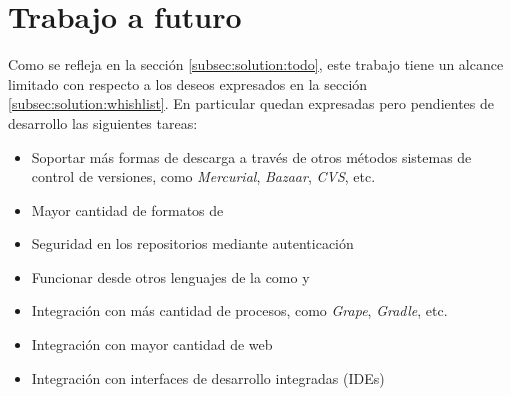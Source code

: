 \section{Trabajo a futuro}
\label{sec:futurework}

Como se refleja en la sección \ref{subsec:solution:todo}, este trabajo tiene un 
alcance limitado con respecto a los deseos expresados en la sección 
\ref{subsec:solution:whishlist}. En particular quedan expresadas pero 
pendientes de desarrollo las siguientes tareas:

\begin{itemize}
	\setlength{\itemsep}{1pt}
	\setlength{\parskip}{0pt}
	\setlength{\parsep}{0pt}
	\item Soportar más formas de descarga a través de otros métodos sistemas de
		control de versiones, como \emph{Mercurial}, \emph{Bazaar}, \emph{CVS}, etc.
	\item Mayor cantidad de formatos de \conffiles
	\item Seguridad en los repositorios mediante autenticación
	\item Funcionar desde otros lenguajes de la \jvm como \clojure y \groovy
	\item Integración con más cantidad de procesos, como \emph{Grape}, \emph{Gradle}, etc.
	\item Integración con mayor cantidad de \frameworks web
	\item Integración con interfaces de desarrollo integradas (IDEs)
\end{itemize}

